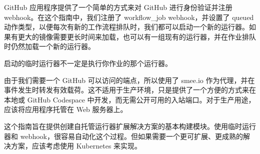 
GitHub 应用程序提供了一个简单的方式来对 GitHub 进行身份验证并注册 webhook。在这个指南中，我们注册了 workflow\_job webhook，并设置了 queued 动作类型，以便每次有新的工作流程排队时，我们都可以启动一个新的运行器。如果有更大的镜像需要更长时间来加载，也可以有一组现有的运行器，并在作业排队时仍然加载一个新的运行器。

启动的临时运行器不一定是执行你作业的那个运行器。

由于我们需要一个 GitHub 可以访问的端点，所以使用了 smee.io 作为代理，并在事件发生时转发有效载荷。这不适用于生产环境，只是提供了一个方便的方式来在本地或 GitHub Codespace 中开发，而无需公开可用的入站端口。对于生产用途，应该将应用程序托管在 Web 服务器上。


这个指南旨在提供创建自托管运行器扩展解决方案的基本构建模块。使用临时运行器和 webhook，很容易自动化这个过程。但如果需要一个更可扩展、更成熟的解决方案，应该考虑使用 Kubernetes 来实现。

